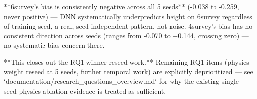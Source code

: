 **6survey's bias is consistently negative across all 5 seeds** (-0.038 to -0.259, never positive)
— DNN systematically underpredicts height on 6survey regardless of training seed, a real,
seed-independent pattern, not noise. 4survey's bias has no consistent direction across seeds
(ranges from -0.070 to +0.144, crossing zero) — no systematic bias concern there.

**This closes out the RQ1 winner-reseed work.** Remaining RQ1 items (physics-weight reseed at
5 seeds, further temporal work) are explicitly deprioritized — see
`documentation/research_questions_overview.md` for why the existing single-seed physics-ablation
evidence is treated as sufficient.
